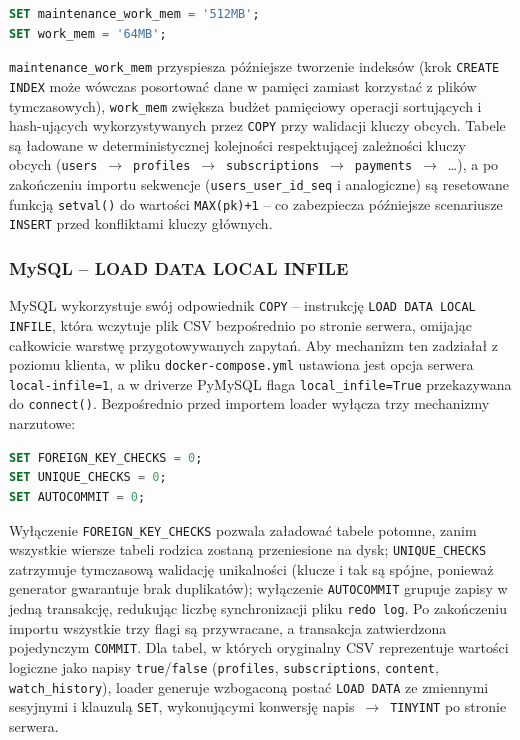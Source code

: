 \begin{lstlisting}[language=SQL,basicstyle=\ttfamily\small]
SET maintenance_work_mem = '512MB';
SET work_mem = '64MB';
\end{lstlisting}

\noindent \texttt{maintenance\_work\_mem} przyspiesza późniejsze tworzenie
indeksów (krok \texttt{CREATE INDEX} może wówczas posortować dane w pamięci
zamiast korzystać z plików tymczasowych), \texttt{work\_mem} zwiększa
budżet pamięciowy operacji sortujących i hash-ujących wykorzystywanych
przez \texttt{COPY} przy walidacji kluczy obcych. Tabele są ładowane
w deterministycznej kolejności respektującej zależności kluczy obcych
(\texttt{users}~$\rightarrow$~\texttt{profiles}~$\rightarrow$~\texttt{subscriptions}~$\rightarrow$~\texttt{payments}~$\rightarrow$~\dots),
a po zakończeniu importu sekwencje (\texttt{users\_user\_id\_seq} i analogiczne)
są resetowane funkcją \texttt{setval()} do wartości \texttt{MAX(pk)+1} -- co
zabezpiecza późniejsze scenariusze \texttt{INSERT} przed konfliktami kluczy
głównych.

\subsubsection*{MySQL -- LOAD DATA LOCAL INFILE}

MySQL wykorzystuje swój odpowiednik \texttt{COPY} -- instrukcję
\texttt{LOAD DATA LOCAL INFILE}, która wczytuje plik CSV bezpośrednio
po stronie serwera, omijając całkowicie warstwę przygotowywanych
zapytań. Aby mechanizm ten zadziałał z poziomu klienta, w pliku
\texttt{docker-compose.yml} ustawiona jest opcja serwera
\texttt{local-infile=1}, a w driverze PyMySQL flaga
\texttt{local\_infile=True} przekazywana do \texttt{connect()}.
Bezpośrednio przed importem loader wyłącza trzy mechanizmy
narzutowe:

\begin{lstlisting}[language=SQL,basicstyle=\ttfamily\small]
SET FOREIGN_KEY_CHECKS = 0;
SET UNIQUE_CHECKS = 0;
SET AUTOCOMMIT = 0;
\end{lstlisting}

\noindent Wyłączenie \texttt{FOREIGN\_KEY\_CHECKS} pozwala załadować
tabele potomne, zanim wszystkie wiersze tabeli rodzica zostaną
przeniesione na dysk; \texttt{UNIQUE\_CHECKS} zatrzymuje tymczasową
walidację unikalności (klucze i tak są spójne, ponieważ generator
gwarantuje brak duplikatów); wyłączenie \texttt{AUTOCOMMIT} grupuje
zapisy w jedną transakcję, redukując liczbę synchronizacji pliku
\texttt{redo log}. Po zakończeniu importu wszystkie trzy flagi są
przywracane, a transakcja zatwierdzona pojedynczym \texttt{COMMIT}.
Dla tabel, w których oryginalny CSV reprezentuje wartości logiczne
jako napisy \texttt{true}/\texttt{false} (\texttt{profiles},
\texttt{subscriptions}, \texttt{content}, \texttt{watch\_history}),
loader generuje wzbogaconą postać \texttt{LOAD DATA} ze zmiennymi
sesyjnymi i klauzulą \texttt{SET}, wykonującymi konwersję
napis~$\rightarrow$~\texttt{TINYINT} po stronie serwera.

